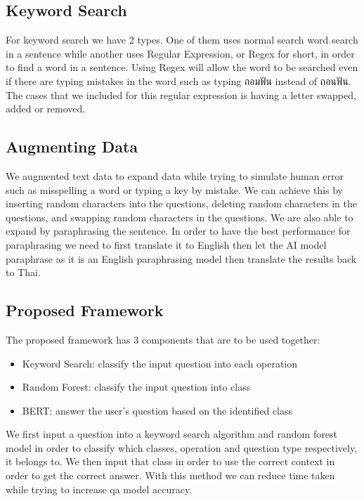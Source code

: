 \documentclass[12pt,oneside,openright,a4paper]{cpe-english-project}
\begin{document}
    \subsection{Keyword Search}
      \qquad For keyword search we have 2 types. One of them uses normal search word search in a sentence while another uses Regular Expression, or Regex for short, in order to find a word in a sentence. Using Regex will allow the word to be searched even if there are typing mistakes in the word such as typing \textthai{ถอมฟัน} instead of \textthai{ถอนฟัน}. The cases that we included for this regular expression is having a letter swapped, added or removed. \par

    \subsection{Augmenting Data}
      \qquad We augmented text data to expand data while trying to simulate human error such as misspelling a word or typing a key by mistake. We can achieve this by inserting random characters into the questions, deleting random characters in the questions, and swapping random characters in the questions. We are also able to expand by paraphrasing the sentence. In order to have the best performance for paraphrasing we need to first translate it to English then let the AI model\cite{huggingface2} paraphrase as it is an English paraphrasing model then translate the results back to Thai.\par
    \subsection{Proposed Framework}
      \qquad The proposed framework has 3 components that are to be used together:\par
      \begin{itemize}
        \item Keyword Search: classify the input question into each operation        
        \item Random Forest: classify the input question into class
        \item BERT: answer the user's question based on the identified class
      \end{itemize}
      \qquad We first input a question into a keyword search algorithm and random forest model in order to classify which classes, operation and question type respectively, it belongs to. We then input that class in order to use the correct context in order to get the correct answer. With this method we can reduce time taken while trying to increase qa model accuracy. \par
\end{document}

